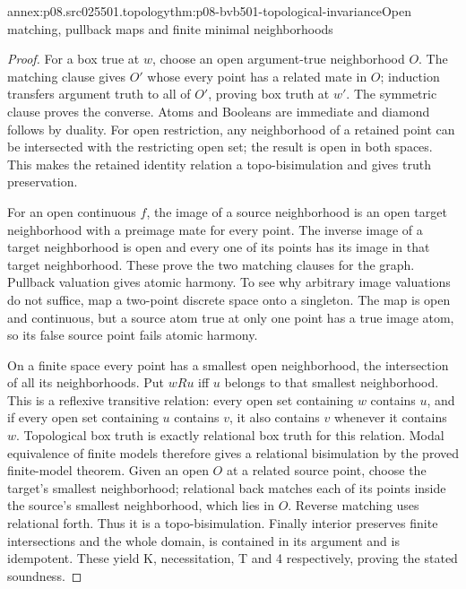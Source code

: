\begin{annexitem}{annex:p08.src025501.topology}{thm:p08-bvb501-topological-invariance}{Open matching, pullback maps and finite minimal neighborhoods}
\begin{proof}
For a box true at \(w\), choose an open argument-true neighborhood
\(O\). The matching clause gives \(O'\) whose every point has
a related mate in \(O\); induction transfers argument truth to
all of \(O'\), proving box truth at \(w'\). The symmetric
clause proves the converse. Atoms and Booleans are immediate and
diamond follows by duality. For open restriction, any neighborhood
of a retained point can be intersected with the restricting open set;
the result is open in both spaces. This makes the retained identity
relation a topo-bisimulation and gives truth preservation.

For an open continuous \(f\), the image of a source neighborhood
is an open target neighborhood with a preimage mate for every point.
The inverse image of a target neighborhood is open and every one
of its points has its image in that target neighborhood. These prove
the two matching clauses for the graph. Pullback valuation gives
atomic harmony. To see why arbitrary image valuations do not suffice,
map a two-point discrete space onto a singleton. The map is open
and continuous, but a source atom true at only one point has a true
image atom, so its false source point fails atomic harmony.

On a finite space every point has a smallest open neighborhood,
the intersection of all its neighborhoods. Put \(wRu\) iff
\(u\) belongs to that smallest neighborhood. This is a reflexive
transitive relation: every open set containing \(w\) contains
\(u\), and if every open set containing \(u\) contains
\(v\), it also contains \(v\) whenever it contains \(w\).
Topological box truth is exactly relational box truth for this
relation. Modal equivalence of finite models therefore gives a
relational bisimulation by the proved finite-model theorem. Given an
open \(O\) at a related source point, choose the target's smallest
neighborhood; relational back matches each of its points inside the
source's smallest neighborhood, which lies in \(O\). Reverse
matching uses relational forth. Thus it is a topo-bisimulation.
Finally interior preserves finite intersections and the whole domain,
is contained in its argument and is idempotent. These yield K,
necessitation, T and 4 respectively, proving the stated soundness.
\end{proof}
\end{annexitem}

